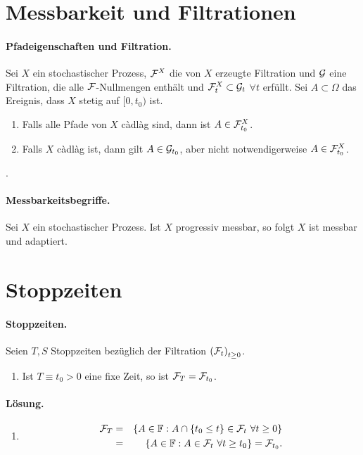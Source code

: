 
\section{Messbarkeit und Filtrationen}

\paragraph{Pfadeigenschaften und Filtration. }  Sei $X$ ein stochastischer
Prozess, $\mathcal F^{X}$ die von $X$ erzeugte Filtration und $\mathcal G$ eine Filtration,
die alle $\mathcal F$-Nullmengen enthält und $\mathcal F^{X}_t \subset \mathcal G_t$ $\forall t$
erfüllt.  Sei $A \subset \Omega$ das Ereignis, dass $X$ stetig auf $[0, t_0)$
ist. 
\begin{enumerate}
    \item Falls alle Pfade von $X$ c\`adl\`ag sind, dann ist $A \in \mathcal F^{X}_{t_0}$.
    \item Falls $X$ c\`adl\`ag ist, dann gilt $A \in \mathcal G_{t_0}$, aber nicht
        notwendigerweise $A \in \mathcal F^{X}_{t_0}$.
\end{enumerate}
\cite{Karatzas1991}.

\paragraph{Messbarkeitsbegriffe. } Sei $X$ ein stochastischer Prozess. Ist $X$
progressiv messbar, so folgt $X$ ist messbar und adaptiert.


\section{Stoppzeiten}

\paragraph{Stoppzeiten. } Seien $T,S$ Stoppzeiten bezüglich der Filtration
$\left( \mathcal F_t \right)_{t \geq 0}$. 
\begin{enumerate}
    \item Ist $T \equiv t_0>0$ eine fixe Zeit, so ist $\mathcal F_T=\mathcal F_{t_0}$.
\end{enumerate}

\paragraph*{Lösung. }
\begin{enumerate}
    \item \begin{eqnarray}
            \mathcal F_T &=& 
            \left\{ A\in\mathbb F : A \cap \left\{ t_0 \leq t \right\}\in\mathcal F_t \ \forall t\geq 0 \right\} \\
            &=& \left\{ A\in\mathbb F : A\in\mathcal F_t \ \forall t\geq t_0 \right\} = \mathcal F_{t_0}.
        \end{eqnarray}
\end{enumerate}


